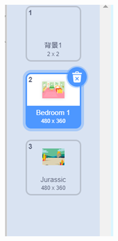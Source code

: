 \documentclass[10.5pt, a4paper]{article}
\begin{document}
\begin{enumerate}
\begin{figure}[htbp]
            \begin{minipage}[t]{.09\textwidth}
                \centering
                \includegraphics[width=\textwidth]{13.png}

\end{minipage}
\end{figure}
\end{enumerate}
\end{document}
